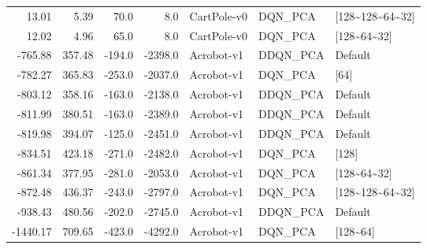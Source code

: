 \begin{tabular}{rrrrlll}
   13.01 &    5.39 &   70.0 &     8.0 &     CartPole-v0 &   DQN\_PCA &  [128\textasciitilde 128\textasciitilde 64\textasciitilde 32] \\
   12.02 &    4.96 &   65.0 &     8.0 &     CartPole-v0 &   DQN\_PCA &       [128\textasciitilde 64\textasciitilde 32] \\
 -765.88 &  357.48 & -194.0 & -2398.0 &      Acrobot-v1 &  DDQN\_PCA &             Default \\
 -782.27 &  365.83 & -253.0 & -2037.0 &      Acrobot-v1 &   DQN\_PCA &                [64] \\
 -803.12 &  358.16 & -163.0 & -2138.0 &      Acrobot-v1 &  DDQN\_PCA &             Default \\
 -811.99 &  380.51 & -163.0 & -2389.0 &      Acrobot-v1 &  DDQN\_PCA &             Default \\
 -819.98 &  394.07 & -125.0 & -2451.0 &      Acrobot-v1 &  DDQN\_PCA &             Default \\
 -834.51 &  423.18 & -271.0 & -2482.0 &      Acrobot-v1 &   DQN\_PCA &               [128] \\
 -861.34 &  377.95 & -281.0 & -2053.0 &      Acrobot-v1 &   DQN\_PCA &       [128\textasciitilde 64\textasciitilde 32] \\
 -872.48 &  436.37 & -243.0 & -2797.0 &      Acrobot-v1 &   DQN\_PCA &  [128\textasciitilde 128\textasciitilde 64\textasciitilde 32] \\
 -938.43 &  480.56 & -202.0 & -2745.0 &      Acrobot-v1 &  DDQN\_PCA &             Default \\
-1440.17 &  709.65 & -423.0 & -4292.0 &      Acrobot-v1 &   DQN\_PCA &           [128\textasciitilde 64] \\
\bottomrule
\end{tabular}
